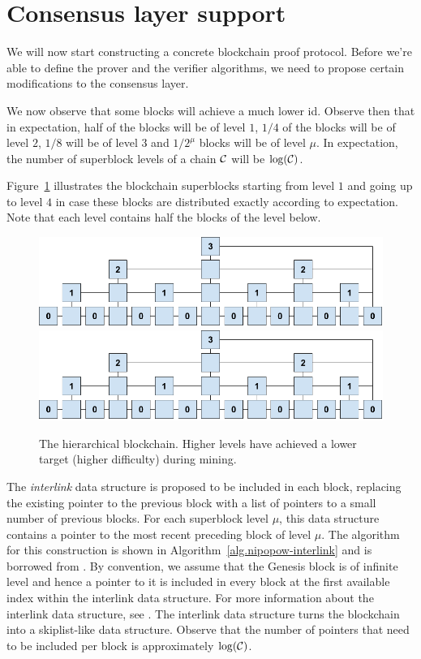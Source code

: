 \section{Consensus layer support} \label{sec:consensus}

We will now start constructing a concrete blockchain proof protocol. Before
we're able to define the prover and the verifier algorithms, we need to propose
certain modifications to the consensus layer.

We now observe that some blocks will achieve a much lower id. Observe then that
in expectation, half of the blocks will be of level $1$, $1/4$ of the blocks
will be of level $2$, $1/8$ will be of level $3$ and $1/2^\mu$ blocks will be of
level $\mu$. In expectation, the number of superblock levels of a chain $\mathcal{C}$
will be $\log(\mathcal{C})$.

Figure~\ref{fig.hierarchy} illustrates the blockchain superblocks starting from
level $1$ and going up to level $4$ in case these blocks are distributed
exactly according to expectation. Note that each level contains half the blocks
of the level below.

\begin{figure}
    \caption{The hierarchical blockchain.
    Higher levels have achieved a lower target (higher difficulty) during mining.}
    \centering
    \iftwocolumn
        \includegraphics[width=\columnwidth,keepaspectratio]{figures/hierarchical-ledger.png}
    \else
        \includegraphics[width=0.7\columnwidth,keepaspectratio]{figures/hierarchical-ledger.png}
    \fi
    \label{fig.hierarchy}
\end{figure}

The \textit{interlink} data structure is proposed to be included in each block,
replacing the existing pointer to the previous block with a list of pointers to
a small number of previous blocks. For each superblock level $\mu$, this data
structure contains a pointer to the most recent preceding block of level
$\mu$. The algorithm for this construction is shown in
Algorithm~\ref{alg.nipopow-interlink} and is borrowed from \cite{KLS}. By
convention, we assume that the Genesis block is of infinite level and hence a
pointer to it is included in every block at the first available index within
the interlink data structure. For more information about the interlink data
structure, see \cite{KLS}. The interlink data structure turns the blockchain
into a skiplist-like data structure. Observe that the number of pointers that
need to be included per block is approximately $\log(\mathcal{C})$.

